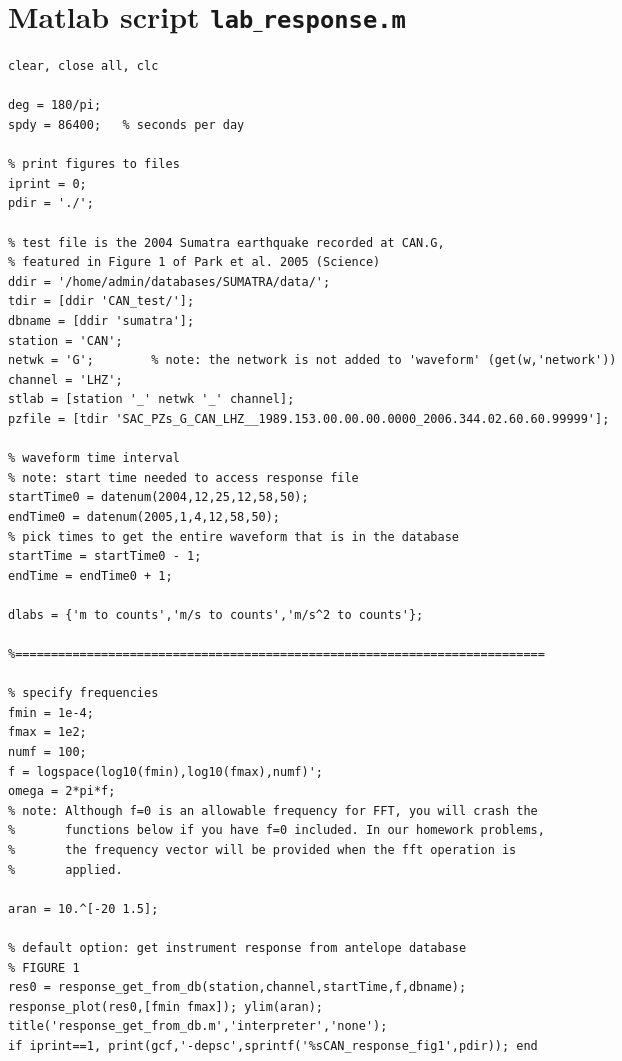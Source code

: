 \documentclass[11pt,titlepage,fleqn]{article}
\newcommand{\tfile}{{\tt lab$\_$response.m}}
\begin{document}
\pagebreak



\appendix

\section{Matlab script \tfile}
\label{sec:script}

\small
\begin{spacing}{1.0}
\begin{verbatim}
clear, close all, clc

deg = 180/pi;
spdy = 86400;   % seconds per day

% print figures to files
iprint = 0;
pdir = './';

% test file is the 2004 Sumatra earthquake recorded at CAN.G,
% featured in Figure 1 of Park et al. 2005 (Science)
ddir = '/home/admin/databases/SUMATRA/data/';
tdir = [ddir 'CAN_test/'];
dbname = [ddir 'sumatra'];
station = 'CAN';
netwk = 'G';        % note: the network is not added to 'waveform' (get(w,'network'))
channel = 'LHZ';
stlab = [station '_' netwk '_' channel];
pzfile = [tdir 'SAC_PZs_G_CAN_LHZ__1989.153.00.00.00.0000_2006.344.02.60.60.99999'];

% waveform time interval
% note: start time needed to access response file
startTime0 = datenum(2004,12,25,12,58,50);
endTime0 = datenum(2005,1,4,12,58,50);
% pick times to get the entire waveform that is in the database
startTime = startTime0 - 1;
endTime = endTime0 + 1;

dlabs = {'m to counts','m/s to counts','m/s^2 to counts'};

%==========================================================================

% specify frequencies
fmin = 1e-4;
fmax = 1e2;
numf = 100;
f = logspace(log10(fmin),log10(fmax),numf)';
omega = 2*pi*f;
% note: Although f=0 is an allowable frequency for FFT, you will crash the
%       functions below if you have f=0 included. In our homework problems,
%       the frequency vector will be provided when the fft operation is
%       applied.

aran = 10.^[-20 1.5];

% default option: get instrument response from antelope database
% FIGURE 1
res0 = response_get_from_db(station,channel,startTime,f,dbname);
response_plot(res0,[fmin fmax]); ylim(aran);
title('response_get_from_db.m','interpreter','none');
if iprint==1, print(gcf,'-depsc',sprintf('%sCAN_response_fig1',pdir)); end


\end{verbatim}
\end{spacing}
\end{document}
